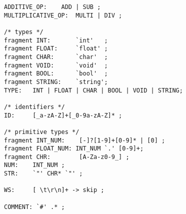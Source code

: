 \documentclass[11pt,letterpaper]{article}
\begin{document}
\begin{lstlisting}[tabsize=2]
ADDITIVE_OP:    ADD | SUB ;
MULTIPLICATIVE_OP:  MULTI | DIV ;

/* types */
fragment INT:       `int'   ;
fragment FLOAT:     `float' ;
fragment CHAR:      `char'  ;
fragment VOID:      `void'  ;
fragment BOOL:      `bool'  ;
fragment STRING:    `string';
TYPE:   INT | FLOAT | CHAR | BOOL | VOID | STRING;

/* identifiers */
ID:     [_a-zA-Z]+[_0-9a-zA-Z]* ;   

/* primitive types */
fragment INT_NUM:    [-]?[1-9]+[0-9]* | [0] ;    
fragment FLOAT_NUM: INT_NUM `.' [0-9]+; 
fragment CHR:        [A-Za-z0-9_] ;
NUM:    INT_NUM ;
STR:    `"' CHR* `"' ;

WS:     [ \t\r\n]+ -> skip ;

COMMENT: `#' .* ;
\end{lstlisting}	
\end{document}
